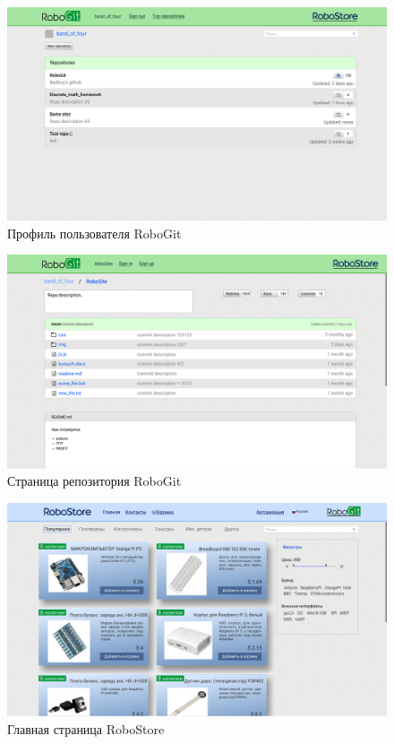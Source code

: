 \documentclass[12pt, a4paper]{article}
\begin{document}
\begin{figure}[H]
  \centering
  \includegraphics[width=17cm]{png/git_profile.png}
  \caption{Профиль пользователя RoboGit}
\end{figure}

\begin{figure}[H]
  \centering
  \includegraphics[width=17cm]{png/git_repo.png}
  \caption{Страница репозитория RoboGit}
\end{figure}

\begin{figure}[H]
  \centering
  \includegraphics[width=17cm]{png/store_main.png}
  \caption{Главная страница RoboStore}
\end{figure}
\end{document}
